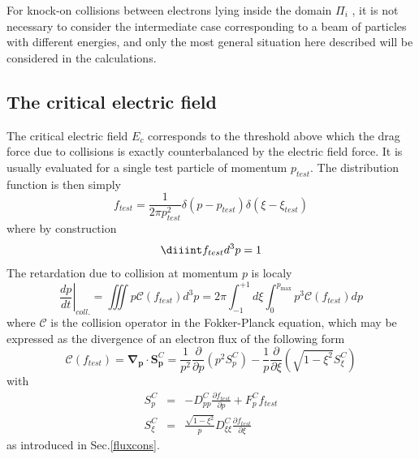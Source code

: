 For knock-on collisions between electrons lying inside the domain $\Pi _{i}$%
, it is not necessary to consider the intermediate case corresponding to a
beam of particles with different energies, and only the most general
situation here described will be considered in the calculations.

\subsection{The critical electric field}

The critical electric field $E_{c}$ corresponds to the threshold above which
the drag force due to collisions is exactly counterbalanced by the electric
field force. It is usually evaluated for a single test particle of momentum $%
p_{test}$. The distribution function is then simply 
\begin{equation}
f_{test}=\frac{1}{2\pi p_{test}^{2}}\delta \left( p-p_{test}\right) \delta
\left( \xi -\xi _{test}\right) 
\end{equation}%
where by construction%
\begin{equation}
\diiint f_{test}d^{3}p=1
\end{equation}%
The retardation due to collision at momentum $p$ is localy 
\begin{equation}
\left. \frac{dp}{dt}\right\vert _{coll.}=\iiint p\mathcal{C}\left(
f_{test}\right) d^{3}p=2\pi \int_{-1}^{+1}d\xi \int_{0}^{p_{\max }}p^{3}%
\mathcal{C}\left( f_{test}\right) dp  \label{retardation}
\end{equation}%
where $\mathcal{C}$ is the collision operator in the Fokker-Planck equation,
which may be expressed as the divergence of an electron flux of the
following form 
\begin{equation}
\mathcal{C}\left( f_{test}\right) =\mathbf{\nabla }_{\mathbf{p}}\cdot 
\mathbf{S}_{\mathbf{p}}^{C}=\frac{1}{p^{2}}\frac{\partial }{\partial p}%
\left( p^{2}S_{p}^{C}\right) -\frac{1}{p}\frac{\partial }{\partial \xi }%
\left( \sqrt{1-\xi ^{2}}S_{\xi }^{C}\right) 
\end{equation}%
with 
\begin{eqnarray}
S_{p}^{C} &=&-D_{pp}^{C}\frac{\partial f_{test}}{\partial p}%
+F_{p}^{C}f_{test} \\
S_{\xi }^{C} &=&\frac{\sqrt{1-\xi ^{2}}}{p}D_{\xi \xi }^{C}\frac{\partial
f_{test}}{\partial \xi }
\end{eqnarray}%
as introduced in Sec.\ref{fluxcons}.

